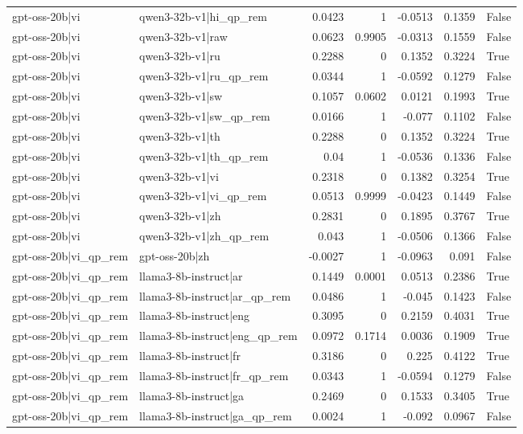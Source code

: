 \begin{table}
\begin{tabular}{l l r r r r l}
gpt-oss-20b|vi & qwen3-32b-v1|hi_qp_rem & 0.0423 & 1 & -0.0513 & 0.1359 & False \\
gpt-oss-20b|vi & qwen3-32b-v1|raw & 0.0623 & 0.9905 & -0.0313 & 0.1559 & False \\
gpt-oss-20b|vi & qwen3-32b-v1|ru & 0.2288 & 0 & 0.1352 & 0.3224 & True \\
gpt-oss-20b|vi & qwen3-32b-v1|ru_qp_rem & 0.0344 & 1 & -0.0592 & 0.1279 & False \\
gpt-oss-20b|vi & qwen3-32b-v1|sw & 0.1057 & 0.0602 & 0.0121 & 0.1993 & True \\
gpt-oss-20b|vi & qwen3-32b-v1|sw_qp_rem & 0.0166 & 1 & -0.077 & 0.1102 & False \\
gpt-oss-20b|vi & qwen3-32b-v1|th & 0.2288 & 0 & 0.1352 & 0.3224 & True \\
gpt-oss-20b|vi & qwen3-32b-v1|th_qp_rem & 0.04 & 1 & -0.0536 & 0.1336 & False \\
gpt-oss-20b|vi & qwen3-32b-v1|vi & 0.2318 & 0 & 0.1382 & 0.3254 & True \\
gpt-oss-20b|vi & qwen3-32b-v1|vi_qp_rem & 0.0513 & 0.9999 & -0.0423 & 0.1449 & False \\
gpt-oss-20b|vi & qwen3-32b-v1|zh & 0.2831 & 0 & 0.1895 & 0.3767 & True \\
gpt-oss-20b|vi & qwen3-32b-v1|zh_qp_rem & 0.043 & 1 & -0.0506 & 0.1366 & False \\
gpt-oss-20b|vi_qp_rem & gpt-oss-20b|zh & -0.0027 & 1 & -0.0963 & 0.091 & False \\
gpt-oss-20b|vi_qp_rem & llama3-8b-instruct|ar & 0.1449 & 0.0001 & 0.0513 & 0.2386 & True \\
gpt-oss-20b|vi_qp_rem & llama3-8b-instruct|ar_qp_rem & 0.0486 & 1 & -0.045 & 0.1423 & False \\
gpt-oss-20b|vi_qp_rem & llama3-8b-instruct|eng & 0.3095 & 0 & 0.2159 & 0.4031 & True \\
gpt-oss-20b|vi_qp_rem & llama3-8b-instruct|eng_qp_rem & 0.0972 & 0.1714 & 0.0036 & 0.1909 & True \\
gpt-oss-20b|vi_qp_rem & llama3-8b-instruct|fr & 0.3186 & 0 & 0.225 & 0.4122 & True \\
gpt-oss-20b|vi_qp_rem & llama3-8b-instruct|fr_qp_rem & 0.0343 & 1 & -0.0594 & 0.1279 & False \\
gpt-oss-20b|vi_qp_rem & llama3-8b-instruct|ga & 0.2469 & 0 & 0.1533 & 0.3405 & True \\
gpt-oss-20b|vi_qp_rem & llama3-8b-instruct|ga_qp_rem & 0.0024 & 1 & -0.092 & 0.0967 & False \\

\end{tabular}
\end{table}

